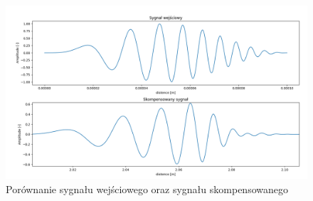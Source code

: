\begin{figure}[h]
\centering
\includegraphics[width=14cm]{Zdjecia/4/Wilcoxporownanie}
\caption{Porównanie sygnału wejściowego oraz sygnału skompensowanego}
\label{fig:willast}
\end{figure}
